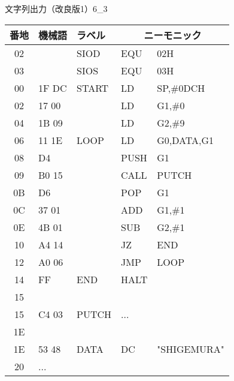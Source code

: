 \begin{figure}[btp]
\begin{reidai}{文字列出力（改良版1）}{6_3}
\begin{description}
{\tt\footnotesize\begin{center}
\begin{tabular}{|c|l|l|l l|} \hline
番地 & 機械語 & ラベル & \multicolumn{2}{|c|}{ニーモニック} \\
\hline
02 &       & SIOD  & EQU  & 02H             \\
03 &       & SIOS  & EQU  & 03H             \\
00 & 1F DC & START & LD   & SP,\#0DCH       \\
02 & 17 00 &       & LD   & G1,\#0          \\
04 & 1B 09 &       & LD   & G2,\#9          \\
06 & 11 1E & LOOP  & LD   & G0,DATA,G1      \\
08 & D4    &       & PUSH & G1              \\
09 & B0 15 &       & CALL & PUTCH           \\
0B & D6    &       & POP  & G1              \\
0C & 37 01 &       & ADD  & G1,\#1          \\
0E & 4B 01 &       & SUB  & G2,\#1          \\
10 & A4 14 &       & JZ   & END             \\
12 & A0 06 &       & JMP  & LOOP            \\
14 & FF    & END   & HALT &                 \\
15 &       &       &      &                 \\
15 & C4 03 & PUTCH & ...  &                 \\
1E &       &       &      &                 \\
1E & 53 48 & DATA  & DC   & "SHIGEMURA"     \\
20 & ...   &       &      &                 \\
\hline
\end{tabular}
\end{center}}
\end{description}
\end{reidai}
\end{figure}

